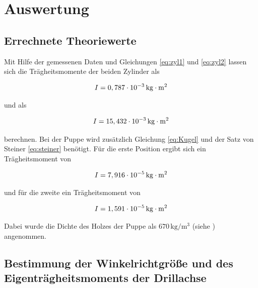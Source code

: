 \section{Auswertung}
\label{sec:Auswertung}

\subsection{Errechnete Theoriewerte}

Mit Hilfe der gemessenen Daten und Gleichungen \ref{eq:zyl1} und \ref{eq:zyl2}
lassen sich die Trägheitsmomente der beiden Zylinder
als

\begin{equation*}
  I=0,787 \cdot 10^{-3}\,\si[inter-unit-product=\cdot]{\kilo\gram\meter\squared}
\end{equation*}

\noindent und als

\begin{equation*}
  I=15,432 \cdot 10^{-3}\,\si[inter-unit-product=\cdot]{\kilo\gram\meter\squared}
\end{equation*}

\noindent berechnen. Bei der Puppe wird zusätzlich 
Gleichung \ref{eq:Kugel} und der Satz von Steiner \ref{eq:steiner}
benötigt. Für die erste Position ergibt sich ein
Trägheitsmoment von

\begin{equation*}
  I=7,916 \cdot 10^{-5}\,\si[inter-unit-product=\cdot]{\kilo\gram\meter\squared}
\end{equation*}

\noindent und für die zweite ein Trägheitsmoment von

\begin{equation*}
  I=1,591 \cdot 10^{-5}\,\si[inter-unit-product=\cdot]{\kilo\gram\meter\squared}
\end{equation*}

\noindent Dabei wurde die Dichte des Holzes der Puppe
als $670\,\si{\kilo\gram \per \cubic \meter}$ (siehe \cite{holz})
angenommen.
















\subsection{Bestimmung der Winkelrichtgröße und des Eigenträgheitsmoments der Drillachse}

